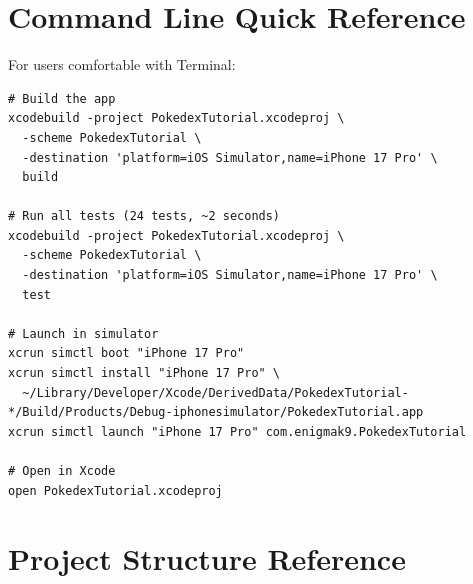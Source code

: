\documentclass[11pt,a4paper]{article}
\begin{document}
\section{Command Line Quick Reference}

For users comfortable with Terminal:

\begin{lstlisting}[style=bashstyle]
# Build the app
xcodebuild -project PokedexTutorial.xcodeproj \
  -scheme PokedexTutorial \
  -destination 'platform=iOS Simulator,name=iPhone 17 Pro' \
  build

# Run all tests (24 tests, ~2 seconds)
xcodebuild -project PokedexTutorial.xcodeproj \
  -scheme PokedexTutorial \
  -destination 'platform=iOS Simulator,name=iPhone 17 Pro' \
  test

# Launch in simulator
xcrun simctl boot "iPhone 17 Pro"
xcrun simctl install "iPhone 17 Pro" \
  ~/Library/Developer/Xcode/DerivedData/PokedexTutorial-*/Build/Products/Debug-iphonesimulator/PokedexTutorial.app
xcrun simctl launch "iPhone 17 Pro" com.enigmak9.PokedexTutorial

# Open in Xcode
open PokedexTutorial.xcodeproj
\end{lstlisting}

\section{Project Structure Reference}
\end{document}
